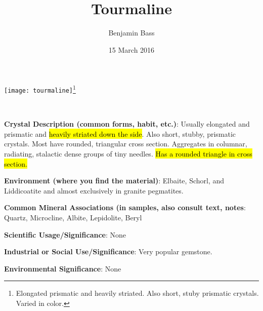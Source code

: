 \documentclass[10pt]{article}
\author{Benjamin Bass}
\date{15 March 2016}
\title{\vspace{-2.0cm} Tourmaline} %
\begin{document}
\maketitle


\begin{center}
  \texttt{[image: tourmaline]}\footnote{Elongated prismatic and heavily striated. Also short, stuby prismatic crystals. Varied in color.}
\end{center}



\
\
\
\
\
\
\
\
\
\

\begin{framed}
  \textbf{Crystal Description (common forms, habit, etc.)}: Usually elongated and prismatic and \hl{heavily striated down the side}. Also short, stubby, prismatic crystals. Most have rounded, triangular cross section. Aggregates in columnar, radiating, stalactic dense groups of tiny needles. \hl{Has a rounded triangle in cross section.}
\end{framed}

\begin{framed}
  \textbf{Environment (where you find the material)}: Elbaite, Schorl, and Liddicoatite and almost exclusively in granite pegmatites.
\end{framed}

\begin{framed}
  \textbf{Common Mineral Associations (in samples, also consult text, notes}: Quartz, Microcline, Albite, Lepidolite, Beryl
\end{framed}

\begin{framed}
  \textbf{Scientific Usage/Significance}: None
\end{framed}

\begin{framed}
  \textbf{Industrial or Social Use/Significance}: Very popular gemstone.
\end{framed}

\begin{framed}
  \textbf{Environmental Significance}: None
\end{framed}

\end{document}
